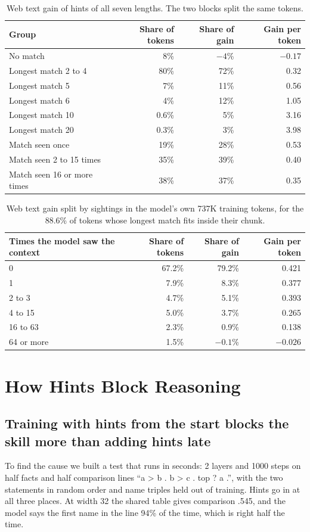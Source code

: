 \documentclass[11pt]{article}
\begin{document}
\begin{table}[h]\centering\small
\begin{tabular}{lrrr}\toprule
Group & Share of tokens & Share of gain & Gain per token\\\midrule
No match & 8\% & $-4$\% & $-0.17$\\
Longest match 2 to 4 & 80\% & 72\% & 0.32\\
Longest match 5 & 7\% & 11\% & 0.56\\
Longest match 6 & 4\% & 12\% & 1.05\\
Longest match 10 & 0.6\% & 5\% & 3.16\\
Longest match 20 & 0.3\% & 3\% & 3.98\\\midrule
Match seen once & 19\% & 28\% & 0.53\\
Match seen 2 to 15 times & 35\% & 39\% & 0.40\\
Match seen 16 or more times & 38\% & 37\% & 0.35\\\bottomrule
\end{tabular}
\caption{Web text gain of hints of all seven lengths. The two blocks split the same tokens.}\label{tab:split}
\end{table}

\begin{table}[h]\centering\small
\begin{tabular}{lrrr}\toprule
Times the model saw the context & Share of tokens & Share of gain & Gain per token\\\midrule
0 & 67.2\% & 79.2\% & 0.421\\
1 & 7.9\% & 8.3\% & 0.377\\
2 to 3 & 4.7\% & 5.1\% & 0.393\\
4 to 15 & 5.0\% & 3.7\% & 0.265\\
16 to 63 & 2.3\% & 0.9\% & 0.138\\
64 or more & 1.5\% & $-0.1$\% & $-0.026$\\\bottomrule
\end{tabular}
\caption{Web text gain split by sightings in the model's own 737K training tokens, for the 88.6\% of tokens whose longest match fits inside their chunk.}\label{tab:modelseen}
\end{table}

\section{How Hints Block Reasoning}\label{sec:block}
\subsection{Training with hints from the start blocks the skill more than adding hints late}
To find the cause we built a test that runs in seconds: 2 layers and 1000 steps on half facts and half comparison lines ``a > b . b > c . top ? a .'', with the two statements in random order and name triples held out of training. Hints go in at all three places. At width 32 the shared table gives comparison .545, and the model says the first name in the line 94\% of the time, which is right half the time.
\end{document}
